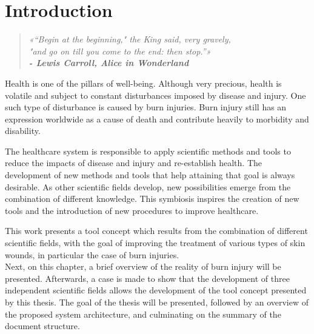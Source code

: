 \newcommand{\novathesis}{\emph{novathesis}}
\newcommand{\novathesisclass}{\texttt{novathesis.cls}}


\chapter{Introduction}
\label{cha:introduction}

\begin{quotation}
\begin{flushright}
\itshape
«“Begin at the beginning," the King said, very gravely, \\"and go on till you come to the end: then stop.”»\\
\textbf{- Lewis Carroll, Alice in Wonderland}
\end{flushright}
\end{quotation}

Health is one of the pillars of well-being. Although very precious, health is volatile and subject to constant disturbances imposed by disease and injury. One such type of disturbance is caused by burn injuries. Burn injury still has an expression worldwide as a cause of death and contribute heavily to morbidity and disability.

The healthcare system is responsible to apply scientific methods and tools to reduce the impacts of disease and injury and re-establish health. The development of new methods and tools that help attaining that goal is always desirable. As other scientific fields develop, new possibilities emerge from the combination of different knowledge. This symbiosis inspires the creation of new tools and the introduction of new procedures to improve healthcare.

This work presents a tool concept which results from the combination of different scientific fields, with the goal of improving the treatment of various types of skin wounds, in particular the case of burn injuries.\\

Next, on this chapter, a brief overview of the reality of burn injury will be presented. Afterwards, a case is made to show that the development of three independent scientific fields allows the development of the tool concept presented by this thesis. The goal of the thesis will be presented, followed by an overview of the proposed system architecture, and culminating on the summary of the document structure.

